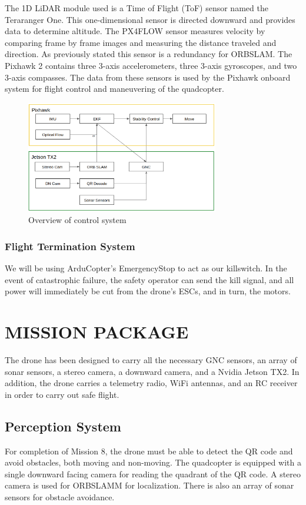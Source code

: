\documentclass[12pt,letterpaper]{article}
\begin{document}
		The 1D LiDAR module used is a Time of Flight (ToF) sensor named the Teraranger One. This one-dimensional sensor is directed downward and provides data to determine altitude. The PX4FLOW sensor measures velocity by comparing frame by frame images and measuring the distance traveled and direction. As previously stated this sensor is a redundancy for ORBSLAM. The Pixhawk 2 contains three 3-axis accelerometers, three 3-axis gyroscopes, and two 3-axis compasses. The data from these sensors is used by the Pixhawk onboard system for flight control and maneuvering of the quadcopter.

		\begin{figure}[!htbp]
			\begin{center}
				\includegraphics[width=0.75\textwidth]{system}
				\caption*{Overview of control system}
			\end{center}
		\end{figure}

		\subsubsection*{Flight Termination System}
		We will be using ArduCopter's EmergencyStop to act as our killswitch. In the event of catastrophic failure, the safety operator can send the kill signal, and all power will immediately be cut from the drone's ESCs, and in turn, the motors.


\section*{MISSION PACKAGE}
	The drone has been designed to carry all the necessary GNC sensors, an array of sonar sensors, a stereo camera, a downward camera, and a Nvidia Jetson TX2. In addition, the drone carries a telemetry radio, WiFi antennas, and an RC receiver in order to carry out safe flight.
	\subsection*{Perception System}
	For completion of Mission 8, the drone must be able to detect the QR code and avoid obstacles, both moving and non-moving. The quadcopter is equipped with a single downward facing camera for reading the quadrant of the QR code. A stereo camera is used for ORBSLAMM for localization. There is also an array of sonar sensors for obstacle avoidance.
\end{document}

